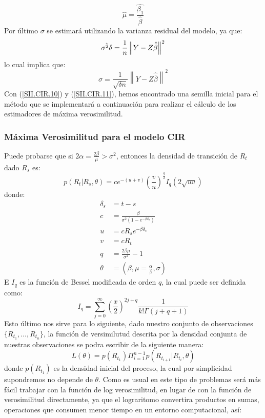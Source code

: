 \documentclass[11pt,notitlepage]{article}
\begin{document}
    \begin{equation}\label{SII.CIR.10}
        \hat{\mu} = \frac{\hat{\beta_1}}{\hat{\beta}} 
    \end{equation}
    Por último \(\sigma\) se estimará utilizando la varianza residual del modelo, ya que:
    \[\Hat{\sigma^2\delta} = \frac{1}{n}\left \|Y -Z\hat{\bar{\beta}}  \right \|^2\]
    lo cual implica que: 
    \begin{equation}\label{SII.CIR.11}
        \hat{\sigma}=\frac{1}{\sqrt{\delta n}}\left\|Y -Z\hat{\bar{\beta}}  \right \|^2
    \end{equation}
    Con (\ref{SII.CIR.10}) y (\ref{SII.CIR.11}), hemos encontrado una semilla inicial para el método que se implementará a continuación para realizar el cálculo de los estimadores de máxima verosimilitud.
    \subsubsection{Máxima Verosimilitud para el modelo CIR} 
    Puede probarse que si \(2\alpha = \frac{2\beta}{\mu} > \sigma^2\), entonces la densidad de transición de \(R_t\) dado \(R_s\) es:
    \begin{equation}\label{SII.CIR.12}
     p(R_t|R_s,\theta) = ce^{-(u + v)}\left(\frac{v}{u}\right)^{\frac{q}{2}}I_{q}(2\sqrt{uv})    
    \end{equation}
    donde:
    \begin{align*}
        \delta_s &= t - s\\
        c &= \frac{\beta}{\sigma^2\left(1 - e^{-\beta\delta_s}\right)}\\
        u  &= cR_se^{-\beta \delta_s}\\
        v  &= cR_t\\
        q  &= \frac{2\beta \mu}{\sigma^2} - 1\\
        \theta &= (\beta,\mu = \frac{\alpha}{\beta},\sigma)
    \end{align*}
    E \(I_{q}\) es la función de Bessel modificada de orden \(q\), la cual puede ser definida como: 
    \[I_{q}= \sum_{j = 0}^{\infty}\left(\frac{x}{2}\right)^{2j + q}\frac{1}{k!\Gamma(j +q +1)}\]
    Esto último nos sirve para lo siguiente, dado nuestro conjunto de observaciones \(\{R_{t_1},\hdots,R_{t_{n}}\}\), la función de versimilutud descrita por la densidad conjunta de nuestras observaciones se podra escribir de la siguiente manera:
    \[L(\theta) = p\left(R_{t_1}\right)\Pi_{i=1}^{n-1}p\left(R_{t_{i+1}}|R_{t_i},\theta \right)\]
    donde \( p\left(R_{t_1}\right)\) es la densidad inicial del proceso, la cual por simplicidad supondremos no depende de \(\theta\). Como es usual en este tipo de problemas será más fácil trabajar con la función de log verosimilitud, en lugar de con la función de verosimilitud directamente, ya que el lograritomo convertira productos en sumas, operaciones que consumen menor tiempo en un entorno computacional, así: 
\end{document}
